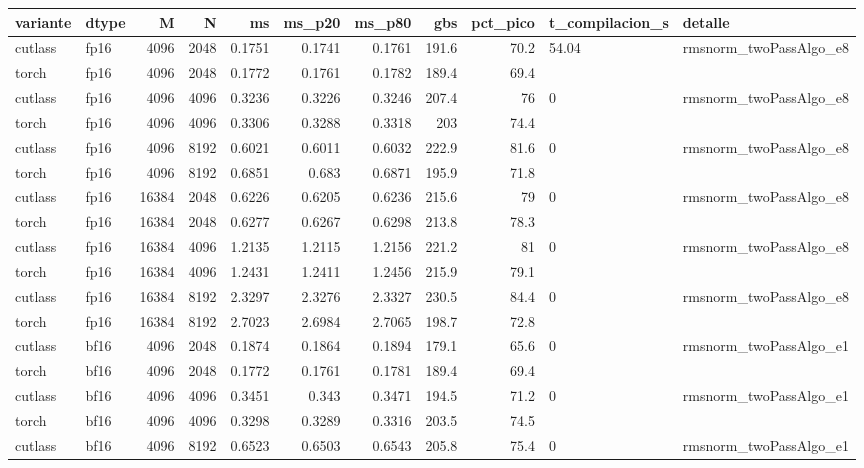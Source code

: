\begin{table}[htbp]
  \centering\small
  \begin{tabular}{llrrrrrrrll}
    \toprule
    variante & dtype & M & N & ms & ms\_p20 & ms\_p80 & gbs & pct\_pico & t\_compilacion\_s & detalle \\
    \midrule
    cutlass & fp16 & 4096 & 2048 & 0.1751 & 0.1741 & 0.1761 & 191.6 & 70.2 & 54.04 & rmsnorm\_twoPassAlgo\_e8 \\
    torch & fp16 & 4096 & 2048 & 0.1772 & 0.1761 & 0.1782 & 189.4 & 69.4 &  &  \\
    cutlass & fp16 & 4096 & 4096 & 0.3236 & 0.3226 & 0.3246 & 207.4 & 76 & 0 & rmsnorm\_twoPassAlgo\_e8 \\
    torch & fp16 & 4096 & 4096 & 0.3306 & 0.3288 & 0.3318 & 203 & 74.4 &  &  \\
    cutlass & fp16 & 4096 & 8192 & 0.6021 & 0.6011 & 0.6032 & 222.9 & 81.6 & 0 & rmsnorm\_twoPassAlgo\_e8 \\
    torch & fp16 & 4096 & 8192 & 0.6851 & 0.683 & 0.6871 & 195.9 & 71.8 &  &  \\
    cutlass & fp16 & 16384 & 2048 & 0.6226 & 0.6205 & 0.6236 & 215.6 & 79 & 0 & rmsnorm\_twoPassAlgo\_e8 \\
    torch & fp16 & 16384 & 2048 & 0.6277 & 0.6267 & 0.6298 & 213.8 & 78.3 &  &  \\
    cutlass & fp16 & 16384 & 4096 & 1.2135 & 1.2115 & 1.2156 & 221.2 & 81 & 0 & rmsnorm\_twoPassAlgo\_e8 \\
    torch & fp16 & 16384 & 4096 & 1.2431 & 1.2411 & 1.2456 & 215.9 & 79.1 &  &  \\
    cutlass & fp16 & 16384 & 8192 & 2.3297 & 2.3276 & 2.3327 & 230.5 & 84.4 & 0 & rmsnorm\_twoPassAlgo\_e8 \\
    torch & fp16 & 16384 & 8192 & 2.7023 & 2.6984 & 2.7065 & 198.7 & 72.8 &  &  \\
    cutlass & bf16 & 4096 & 2048 & 0.1874 & 0.1864 & 0.1894 & 179.1 & 65.6 & 0 & rmsnorm\_twoPassAlgo\_e1 \\
    torch & bf16 & 4096 & 2048 & 0.1772 & 0.1761 & 0.1781 & 189.4 & 69.4 &  &  \\
    cutlass & bf16 & 4096 & 4096 & 0.3451 & 0.343 & 0.3471 & 194.5 & 71.2 & 0 & rmsnorm\_twoPassAlgo\_e1 \\
    torch & bf16 & 4096 & 4096 & 0.3298 & 0.3289 & 0.3316 & 203.5 & 74.5 &  &  \\
    cutlass & bf16 & 4096 & 8192 & 0.6523 & 0.6503 & 0.6543 & 205.8 & 75.4 & 0 & rmsnorm\_twoPassAlgo\_e1 \\

\end{tabular}
\end{table}
